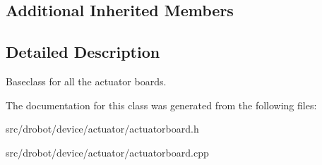 \subsection*{Additional Inherited Members}


\subsection{Detailed Description}
Baseclass for all the actuator boards. 

The documentation for this class was generated from the following files\-:\begin{DoxyCompactItemize}
\item 
src/drobot/device/actuator/actuatorboard.\-h\item 
src/drobot/device/actuator/actuatorboard.\-cpp\end{DoxyCompactItemize}

